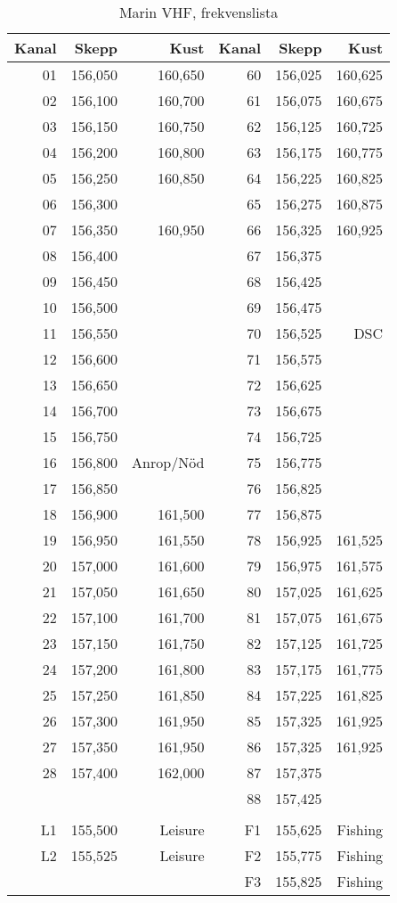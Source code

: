 \begin{table}[H]
\centering
\begin{tabular}{rrr|rrr}
\textbf{Kanal} & \textbf{Skepp} & \textbf{Kust} &
\textbf{Kanal} & \textbf{Skepp} & \textbf{Kust} \\ \hline
01 & 156,050 & 160,650 & 60 & 156,025 & 160,625 \\
02 & 156,100 & 160,700 & 61 & 156,075 & 160,675 \\
03 & 156,150 & 160,750 & 62 & 156,125 & 160,725 \\
04 & 156,200 & 160,800 & 63 & 156,175 & 160,775 \\
05 & 156,250 & 160,850 & 64 & 156,225 & 160,825 \\
06 & 156,300 &         & 65 & 156,275 & 160,875 \\
07 & 156,350 & 160,950 & 66 & 156,325 & 160,925 \\
08 & 156,400 &         & 67 & 156,375 & \\
09 & 156,450 &         & 68 & 156,425 & \\
10 & 156,500 &         & 69 & 156,475 & \\
11 & 156,550 &         & 70 & 156,525 & DSC \\
12 & 156,600 &         & 71 & 156,575 & \\
13 & 156,650 &         & 72 & 156,625 & \\
14 & 156,700 &         & 73 & 156,675 & \\
15 & 156,750 &         & 74 & 156,725 & \\
16 & 156,800 & Anrop/Nöd   & 75 & 156,775 & \\
17 & 156,850 &         & 76 & 156,825 & \\
18 & 156,900 & 161,500 & 77 & 156,875 & \\
19 & 156,950 & 161,550 & 78 & 156,925 & 161,525 \\
20 & 157,000 & 161,600 & 79 & 156,975 & 161,575 \\
21 & 157,050 & 161,650 & 80 & 157,025 & 161,625 \\
22 & 157,100 & 161,700 & 81 & 157,075 & 161,675 \\
23 & 157,150 & 161,750 & 82 & 157,125 & 161,725 \\
24 & 157,200 & 161,800 & 83 & 157,175 & 161,775 \\
25 & 157,250 & 161,850 & 84 & 157,225 & 161,825 \\
26 & 157,300 & 161,950 & 85 & 157,325 & 161,925 \\
27 & 157,350 & 161,950 & 86 & 157,325 & 161,925 \\
28 & 157,400 & 162,000 & 87 & 157,375 & \\
   &         &         & 88 & 157,425 & \\
   &         &         &    &         & \\
L1 & 155,500 & Leisure        & F1 & 155,625 &Fishing \\
L2 & 155,525 & Leisure        & F2 & 155,775 &Fishing \\
   &         &         & F3 & 155,825 & Fishing\\
\end{tabular}
\caption{Marin VHF, frekvenslista}
\end{table}

